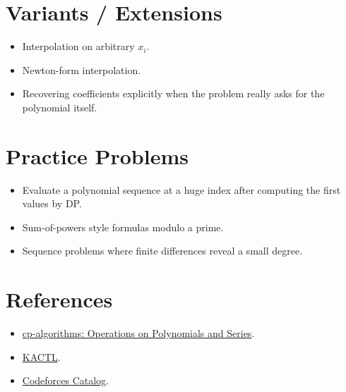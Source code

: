\section*{Variants / Extensions}

\begin{itemize}
  \item Interpolation on arbitrary \(x_i\).
  \item Newton-form interpolation.
  \item Recovering coefficients explicitly when the problem really asks for the polynomial itself.
\end{itemize}

\section*{Practice Problems}

\begin{itemize}
  \item Evaluate a polynomial sequence at a huge index after computing the first values by DP.
  \item Sum-of-powers style formulas modulo a prime.
  \item Sequence problems where finite differences reveal a small degree.
\end{itemize}

\section*{References}

\begin{itemize}
  \item \href{https://cp-algorithms.com/algebra/polynomial.html}{cp-algorithms: Operations on Polynomials and Series}.
  \item \href{https://github.com/kth-competitive-programming/kactl}{KACTL}.
  \item \href{https://codeforces.com/catalog}{Codeforces Catalog}.
\end{itemize}
